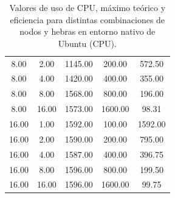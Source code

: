 \begin{table}[ht]
\begin{tabular}{|c|c|c|c|c|}
        8.00           & 2.00            & 1145.00           & 200.00            & 572.50              \\
        8.00           & 4.00            & 1420.00           & 400.00            & 355.00              \\
        8.00           & 8.00            & 1568.00           & 800.00            & 196.00              \\
        8.00           & 16.00           & 1573.00           & 1600.00           & 98.31               \\
        16.00          & 1.00            & 1592.00           & 100.00            & 1592.00             \\
        16.00          & 2.00            & 1590.00           & 200.00            & 795.00              \\
        16.00          & 4.00            & 1587.00           & 400.00            & 396.75              \\
        16.00          & 8.00            & 1596.00           & 800.00            & 199.50              \\
        16.00          & 16.00           & 1596.00           & 1600.00           & 99.75               \\
        \hline
    \end{tabular}
    \caption{Valores de uso de CPU, máximo teórico y eficiencia para distintas combinaciones de nodos y hebras en entorno nativo de Ubuntu (CPU).}
    \label{tab:thread_sweep_ubuntu_cpu_native_cpu}
\end{table}

